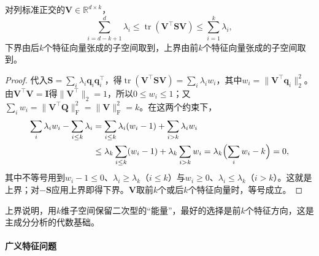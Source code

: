 \begin{theorem}[迹极值]
\label{thm:matrix-analysis-trace-minimum}
对列标准正交的$\bm V\in\mathbb R^{d\times k}$，
\begin{equation}
 \sum_{i=d-k+1}^{d}\lambda_i\leq\operatorname{tr}(\bm V^\top\bm S\bm V)\leq\sum_{i=1}^{k}\lambda_i,
 \label{eq:matrix-analysis-trace-minimum}
\end{equation}
下界由后$k$个特征向量张成的子空间取到，上界由前$k$个特征向量张成的子空间取到。
\end{theorem}
\begin{proof}
代入$\bm S=\sum_i\lambda_i\bm q_i\bm q_i^\top$，得$\operatorname{tr}(\bm V^\top\bm S\bm V)=\sum_i\lambda_iw_i$，其中$w_i=\lVert\bm V^\top\bm q_i\rVert_2^2$。由$\bm V^\top\bm V=\bm I$得$\lVert\bm V^\top\rVert_2=1$，所以$0\leq w_i\leq1$；又$\sum_iw_i=\lVert\bm V^\top\bm Q\rVert_{\mathrm F}^2=\lVert\bm V\rVert_{\mathrm F}^2=k$。在这两个约束下，
\[
 \begin{aligned}
 \sum_i\lambda_iw_i-\sum_{i\leq k}\lambda_i
 &=\sum_{i\leq k}\lambda_i(w_i-1)+\sum_{i>k}\lambda_iw_i\\
 &\leq\lambda_k\sum_{i\leq k}(w_i-1)+\lambda_k\sum_{i>k}w_i
 =\lambda_k\Bigl(\sum_iw_i-k\Bigr)=0,
 \end{aligned}
\]
其中不等号用到$w_i-1\leq0$、$\lambda_i\geq\lambda_k$（$i\leq k$）与$w_i\geq0$、$\lambda_i\leq\lambda_k$（$i>k$）。这就是上界；对$-\bm S$应用上界即得下界。$\bm V$取前$k$个或后$k$个特征向量时，等号成立。
\end{proof}
上界说明，用$k$维子空间保留二次型的“能量”，最好的选择是前$k$个特征方向，这是主成分分析的代数基础。

\paragraph{广义特征问题}

